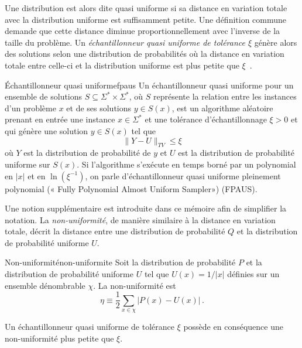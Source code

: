 Une distribution est alors dite quasi uniforme si sa distance en variation totale avec la distribution uniforme est suffisamment petite. Une définition commune demande que cette distance diminue proportionnellement avec l'inverse de la taille du problème. Un \textit{échantillonneur quasi uniforme de tolérance $\xi$} génère alors des solutions selon une distribution de probabilités où la distance en variation totale entre celle-ci et la distribution uniforme est plus petite que $\xi$~\cite{jerrumCountingSamplingIntegrating2003}.

\begin{maindefinition}{Échantillonneur quasi uniforme}{fpaus}
    Un échantillonneur quasi uniforme pour un ensemble de solutions $S \subseteq \Sigma^{*} \times \Sigma^{*}$, où $S$ représente la relation entre les instances d'un problème $x$ et de ses solutions $y \in  S(x)$, est un algorithme aléatoire prenant en entrée une instance $x \in \Sigma^{*}$ et une tolérance d'échantillonnage $\xi > 0$ et qui génère une solution $y \in S(x)$ tel que
    \begin{equation*}
        \lVert Y - U \rVert_{TV} \leq \xi
    \end{equation*}
    où $Y$ est la distribution de probabilité de $y$ et $U$ est la distribution de probabilité uniforme sur $S(x)$. Si l'algorithme s'exécute en temps borné par un polynomial en $\lvert x \rvert$ et en $\ln (\xi^{-1})$, on parle d'échantillonneur quasi uniforme pleinement polynomial (« Fully Polynomial Almost Uniform Sampler») (FPAUS).
\end{maindefinition}

 Une notion supplémentaire est introduite dans ce mémoire afin de simplifier la notation. La \textit{non-uniformité}, de manière similaire à la distance en variation totale, décrit la distance entre une distribution de probabilité $Q$ et la distribution de probabilité uniforme $U$.

\begin{maindefinition}{Non-uniformité}{non-uniformite}
    Soit la distribution de probabilité $P$ et la distribution de probabilité uniforme $U$ tel que $U(x) = 1/\lvert x \rvert$ définies sur un ensemble dénombrable $\chi$. La non-uniformité est
    \begin{equation*}
        \eta \equiv \frac{1}{2} \sum_{x \in \chi} \lvert P(x) - U(x) \rvert \,. 
    \end{equation*}
\end{maindefinition}

Un échantillonneur quasi uniforme de tolérance $\xi$ possède en conséquence une non-uniformité plus petite que $\xi$.

